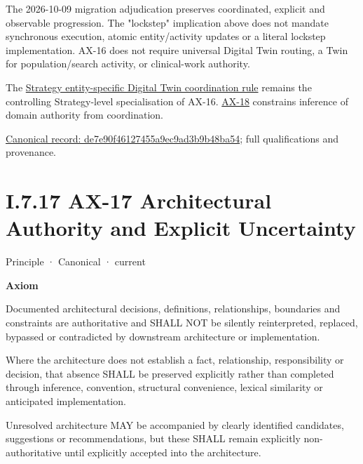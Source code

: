 The 2026-10-09 migration adjudication preserves coordinated, explicit and
observable progression. The "lockstep" implication above does not mandate
synchronous execution, atomic entity/activity updates or a literal lockstep
implementation. AX-16 does not require universal Digital Twin routing, a Twin
for population/search activity, or clinical-work authority.



The \href{\detokenize{../../../../../docs/markdown/02-strategy/strategic-views/logical-component-responsibilities.md#entity-specific-operational-coordination}}{Strategy entity-specific Digital Twin coordination rule}
remains the controlling Strategy-level specialisation of AX-16.
\hyperref[element:b8cafe3cf5904d2bb9a9767260fddf78]{AX-18} constrains inference of domain authority from coordination.


{\footnotesize \href{../../../../continuum/motivation/principle/de7e90f46127455a9ec9ad3b9b48ba54.md}{Canonical record: de7e90f46127455a9ec9ad3b9b48ba54}; full qualifications and provenance.}\par
\section*{I.7.17 AX-17 Architectural Authority and Explicit Uncertainty}
\label{navigation:I.7.17}

\label{element:8882573df7ce43c6bc0f66da0a676139}
{\small Principle · Canonical · current}\par

\par\medskip\textbf{Axiom}\par


Documented architectural decisions, definitions, relationships, boundaries
and constraints are authoritative and SHALL NOT be silently reinterpreted,
replaced, bypassed or contradicted by downstream architecture or
implementation.



Where the architecture does not establish a fact, relationship,
responsibility or decision, that absence SHALL be preserved explicitly
rather than completed through inference, convention, structural
convenience, lexical similarity or anticipated implementation.



Unresolved architecture MAY be accompanied by clearly identified
candidates, suggestions or recommendations, but these SHALL remain
explicitly non-authoritative until explicitly accepted into the
architecture.



